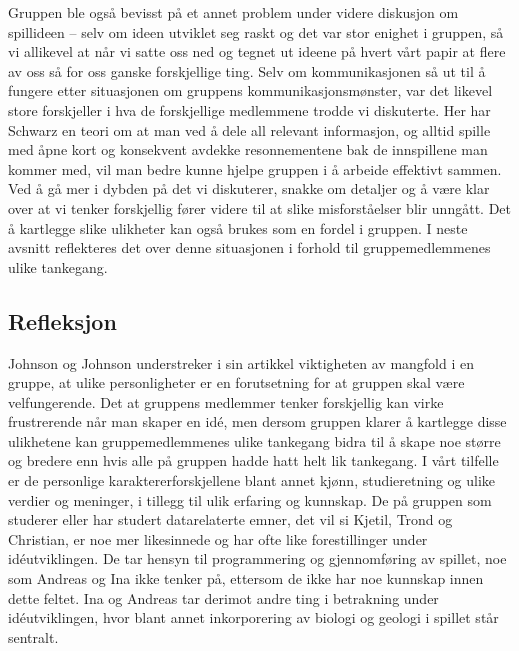 	Gruppen ble også bevisst på et annet problem under videre diskusjon om spillideen – selv om ideen utviklet seg raskt og det var stor enighet i gruppen, så vi allikevel at når vi satte oss ned og tegnet ut ideene på hvert vårt papir at flere av oss så for oss ganske forskjellige ting. Selv om kommunikasjonen så ut til å fungere etter situasjonen om gruppens kommunikasjonsmønster, var det likevel store forskjeller i hva de forskjellige medlemmene trodde vi diskuterte. Her har Schwarz en teori om at man ved å dele all relevant informasjon, og alltid spille med åpne kort og konsekvent avdekke resonnementene bak de innspillene man kommer med, vil man bedre kunne hjelpe gruppen i å arbeide effektivt sammen. Ved å gå mer i dybden på det vi diskuterer, snakke om detaljer og å være klar over at vi tenker forskjellig fører videre til at slike misforståelser blir unngått. Det å kartlegge slike ulikheter kan også brukes som en fordel i gruppen. I neste avsnitt reflekteres det over denne situasjonen i forhold til gruppemedlemmenes ulike tankegang.

	\subsection{Refleksjon} %
	Johnson og Johnson \cite{Johnson} understreker i sin artikkel viktigheten av mangfold i en gruppe, at ulike personligheter er en forutsetning for at gruppen skal være velfungerende. Det at gruppens medlemmer tenker forskjellig kan virke frustrerende når man skaper en idé, men dersom gruppen klarer å kartlegge disse ulikhetene kan gruppemedlemmenes ulike tankegang bidra til å skape noe større og bredere enn hvis alle på gruppen hadde hatt helt lik tankegang. I vårt tilfelle er de personlige karaktererforskjellene blant annet kjønn, studieretning og ulike verdier og meninger, i tillegg til ulik erfaring og kunnskap. De på gruppen som studerer eller har studert datarelaterte emner, det vil si Kjetil, Trond og Christian, er noe mer likesinnede og har ofte like forestillinger under idéutviklingen. De tar hensyn til programmering og gjennomføring av spillet, noe som Andreas og Ina ikke tenker på, ettersom de ikke har noe kunnskap innen dette feltet. Ina og Andreas tar derimot andre ting i betrakning under idéutviklingen, hvor blant annet inkorporering av biologi og geologi i spillet står sentralt.

